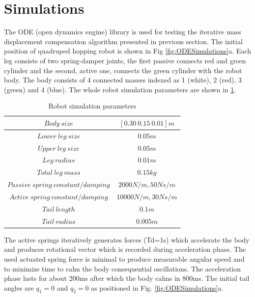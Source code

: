 \section{Simulations}\label{sec:simulation}

The ODE (open dynamics engine) library \cite{ode:2008} is used for testing the iterative mass displacement compensation algorithm presented in previous section. The initial position of quadruped hopping robot is shown in Fig \ref{fig:ODESimulations}a. Each leg consists of two spring-damper joints, the first passive connects red and green cylinder and the second, active one, connects the green cylinder with the robot body. The body consists of 4 connected masses indexed as 1 (white), 2 (red), 3 (green) and 4 (blue). The whole robot simulation parameters are shown in \ref{tab:RobotDimensions}.

\begin{table}
\centering
\begin{tabular}{|c|c|}
	\hline
	$Body\: size$ &  $[0.30\: 0.15\: 0.01]m$ \\
	\hline
	$Lower\:leg\:size$ &  $0.05m$ \\
	\hline
	$Upper\:leg\:size$ &  $0.05m$ \\
	\hline
	$Leg\:radius$ &  $0.01m$ \\
	\hline
	$Total\:leg\:mass$ &  $0.15kg$ \\
	\hline
	$Passive\:spring\:constant/damping$ &  $2000N/m, 50Ns/m$ \\
	\hline
	$Active\:spring\:constant/damping$ &  $10000N/m, 30Ns/m$ \\
	\hline
	$Tail\:length$ &  $0.1m$ \\
	\hline
	$Tail\:radius$ &  $0.005m$ \\
	\hline
\end{tabular}
\caption{Robot simulation parameters}\label{tab:RobotDimensions}
\end{table}



The active springs iteratively generates forces (Td=1s) which accelerate the body and produces rotational vector which is recorded during acceleration phase. The used actuated spring force is minimal to produce measurable angular speed and to minimize time to calm the body consequential oscillations. The acceleration phase lasts for about 200ms after which the body calms in 800ms. The initial tail angles are $q_1=0$ and $q_2=0$ as positioned in Fig. \ref{fig:ODESimulations}a.

